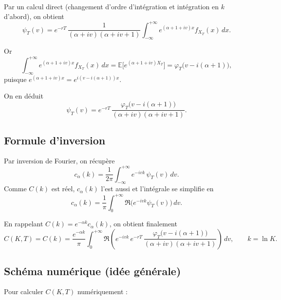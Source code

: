 \documentclass[11pt,a4paper]{article}
\newcommand{\1}{\mathbf{1}}
\begin{document}
Par un calcul direct (changement d'ordre d'int\'egration et int\'egration en
$k$ d'abord), on obtient
\begin{equation}
\psi_T(v)
= e^{-rT}\,\frac{1}{(\alpha+iv)(\alpha+iv+1)}
      \int_{-\infty}^{+\infty} e^{(\alpha+1+iv)x}f_{X_T}(x)\,dx.
\end{equation}

Or
\begin{equation}
\int_{-\infty}^{+\infty} e^{(\alpha+1+iv)x}f_{X_T}(x)\,dx
= \mathbb{E}\big[e^{(\alpha+1+iv)X_T}\big]
= \varphi_T\big( v - i(\alpha+1)\big),
\end{equation}
puisque
$e^{(\alpha+1+iv)x} = e^{i(v-i(\alpha+1))x}$.

On en d\'eduit
\begin{equation}
\boxed{
\psi_T(v)
= e^{-rT}\,
  \frac{\varphi_T\big(v - i(\alpha+1)\big)}
       {(\alpha+iv)(\alpha+iv+1)}.
}
\end{equation}

\subsection{Formule d'inversion}

Par inversion de Fourier, on r\'ecup\`ere
\begin{equation}
c_\alpha(k) = \frac{1}{2\pi}
\int_{-\infty}^{+\infty} e^{-ivk}\,\psi_T(v)\,dv.
\end{equation}
Comme $C(k)$ est r\'eel, $c_\alpha(k)$ l'est aussi et l'int\'egrale se
simplifie en
\begin{equation}
c_\alpha(k) =
\frac{1}{\pi}
\int_0^{+\infty} \Re\!\bigl(e^{-ivk}\psi_T(v)\bigr)\,dv.
\end{equation}

En rappelant $C(k) = e^{-\alpha k} c_\alpha(k)$, on obtient finalement
\begin{equation}
\boxed{
C(K,T)
= C(k)
= \frac{e^{-\alpha k}}{\pi}
  \int_0^{+\infty}
  \Re\!\left(
    e^{-ivk}\,
    e^{-rT}\,
    \frac{\varphi_T\big(v - i(\alpha+1)\big)}
         {(\alpha+iv)(\alpha+iv+1)}
  \right)\,dv,
\qquad k=\ln K.
}
\end{equation}

\subsection{Sch\'ema num\'erique (id\'ee g\'en\'erale)}

Pour calculer $C(K,T)$ num\'eriquement :
\end{document}
